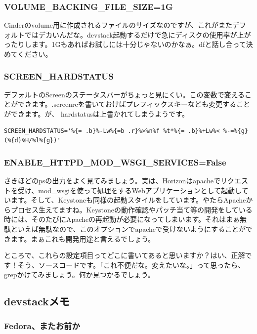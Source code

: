 \documentclass[8pt,b5paper,tombo,openany]{jsbook}
\begin{document}
\subsubsection{VOLUME\_BACKING\_FILE\_SIZE=1G}

Cinderのvolume用に作成されるファイルのサイズなのですが、これがまたデフォルトではデカいんだな。devstack起動するだけで急にディスクの使用率が上がったりします。1Gもあればお試しには十分じゃないのかなぁ。dfと話し合って決めてください。

\subsubsection{SCREEN\_HARDSTATUS}

デフォルトのScreenのステータスバーがちょっと見にくい。この変数で変えることができます。.screenrcを書いておけばプレフィックスキーなども変更することができます。が、 hardstatusは上書かれてしまうようです。

\begin{lstlisting}
SCREEN_HARDSTATUS='%{= .b}%-Lw%{=b .r}%>%n%f %t*%{= .b}%+Lw%< %-=%{g}(%{d}%H/%l%{g})'
\end{lstlisting}

\subsubsection{ENABLE\_HTTPD\_MOD\_WSGI\_SERVICES=False}

さきほどのpsの出力をよく見てみましょう。実は、Horizonはapacheでリクエストを受け、mod\_wsgiを使って処理をするWebアプリケーションとして起動しています。そして、Keystoneも同様の起動スタイルをしています。やたらApacheからプロセス生えてますね。Keystoneの動作確認やパッチ当て等の開発をしている時には、そのたびにApacheの再起動が必要になってしまいます。それはまぁ無駄といえば無駄なので、このオプションでapacheで受けないようにすることができます。まぁこれも開発用途と言えるでしょう。

ところで、これらの設定項目ってどこに書いてあると思いますか？はい、正解です！そう、ソースコードです。「これ不便だな。変えたいな。」って思ったら、grepかけてみましょう。何か見つかるでしょう。

\subsection{devstackメモ}

\subsubsection{Fedora、またお前か}
\end{document}
